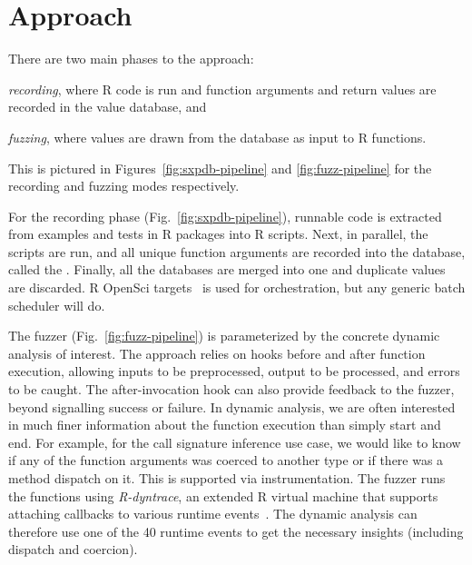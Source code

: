 \documentclass[sigplan,anonymous,review]{acmart}
\begin{document}
\section{Approach}
\label{sec:fuzzy}

There are two main phases to the approach:
%
\begin{inparaenum}[(1)]
\item \emph{recording}, where R code is run and function arguments and return values are recorded in the value database, and %
\item \emph{fuzzing}, where values are drawn from the database as input to R functions. 
\end{inparaenum}
%
This is pictured in Figures~\ref{fig:sxpdb-pipeline} and \ref{fig:fuzz-pipeline} for the recording and fuzzing modes respectively.

For the recording phase (Fig.~\ref{fig:sxpdb-pipeline}), runnable code is extracted from examples and tests in R packages into R scripts.
Next, in parallel, the scripts are run, and all unique function arguments are recorded into the database, called the \sxpdb.
Finally, all the databases are merged into one and duplicate values are discarded.
R OpenSci targets~\cite{landau2021_targets} is used for orchestration, but any generic batch scheduler will do.

The fuzzer (Fig.~\ref{fig:fuzz-pipeline}) is parameterized by the concrete dynamic analysis of interest.
The approach relies on hooks before and after function execution, allowing inputs to be preprocessed, output to be processed, and errors to be caught.
The after-invocation hook can also provide feedback to the fuzzer, beyond signalling success or failure.
In dynamic analysis, we are often interested in much finer information about the function execution than simply start and end.
For example, for the call signature inference use case, we would like to know if any of the function arguments was coerced to another type or if there was a method dispatch on it.
This is supported via instrumentation.
The fuzzer runs the functions using \emph{R-dyntrace}, an extended R virtual machine that supports attaching callbacks to various runtime events~\cite{goel2019}.
The dynamic analysis can therefore use one of the 40 runtime events to get the necessary insights (including dispatch and coercion).
\end{document}
